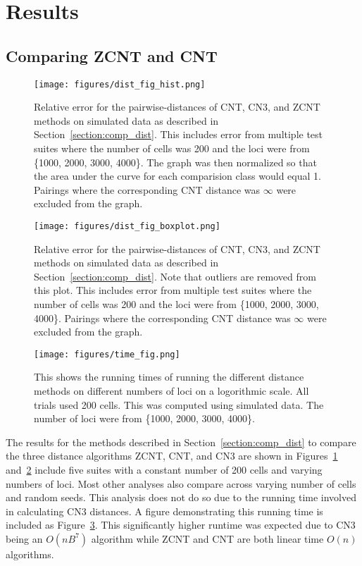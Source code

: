 \section{Results}

\subsection{Comparing ZCNT and CNT}\label{section:comp_dist_res}

\begin{figure}[ht]
    \centering
    \texttt{[image: figures/dist\_fig\_hist.png]}
    \caption{Relative error for the pairwise-distances of CNT, CN3, and ZCNT methods on simulated data as described in Section~\ref{section:comp_dist}. This includes error from multiple test suites where the number of cells was 200 and the loci were from \{1000, 2000, 3000, 4000\}. The graph was then normalized so that the area under the curve for each comparision class would equal 1. Pairings where the corresponding CNT distance was $\infty$ were excluded from the graph.}\label{fig:dist_figure_histogram}
\end{figure}

\begin{figure}[ht]
    \centering
    \texttt{[image: figures/dist\_fig\_boxplot.png]}
    \caption{Relative error for the pairwise-distances of CNT, CN3, and ZCNT methods on simulated data as described in Section~\ref{section:comp_dist}. Note that outliers are removed from this plot. This includes error from multiple test suites where the number of cells was 200 and the loci were from \{1000, 2000, 3000, 4000\}. Pairings where the corresponding CNT distance was $\infty$ were excluded from the graph.}\label{fig:dist_fig_box}
\end{figure}

\begin{figure}[ht]
    \centering 
    \texttt{[image: figures/time\_fig.png]}
    \caption{This shows the running times of running the different distance methods on different numbers of loci on a logorithmic scale. All trials used 200 cells. This was computed using simulated data. The number of loci were from \{1000, 2000, 3000, 4000\}.}\label{fig:time_fig}
\end{figure} 

The results for the methods described in Section~\ref{section:comp_dist} to compare the three distance algorithms ZCNT, CNT, and CN3 are shown in Figures~\ref{fig:dist_figure_histogram} and~\ref{fig:dist_fig_box} include five suites with a constant number of 200 cells and varying numbers of loci. Most other analyses also compare across varying number of cells and random seeds. This analysis does not do so due to the running time involved in calculating CN3 distances. A figure demonstrating this running time is included as Figure~\ref{fig:time_fig}. This significantly higher runtime was expected due to CN3 being an $O(nB^7)$ algorithm while ZCNT and CNT are both linear time $O(n)$ algorithms. 

